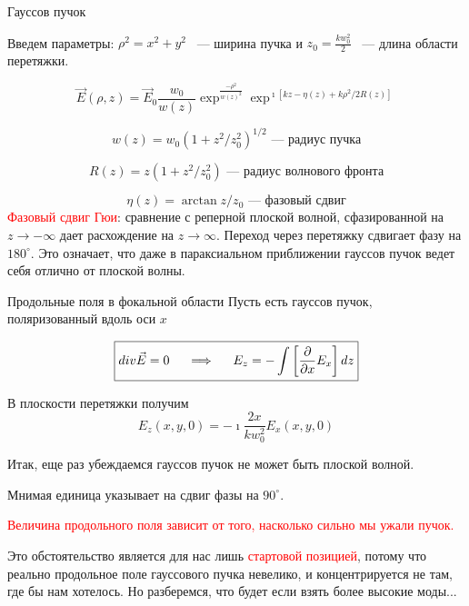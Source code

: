 \documentclass[9pt, compress, xcolor=table]{beamer}
\begin{document}
\begin{frame}{Гауссов пучок}

Введем параметры: $\rho^2 = x^2 + y^2$ ~--- ширина пучка и $z_0 = \frac{k w_0^2}{2}$ ~--- длина области перетяжки.

\begin{equation*}
\boxed{
\vec E(\rho,z) = \vec E_0 \frac{w_0}{w(z)}
\exp^{\frac{-\rho^2}{w(z)^2}}\exp^{\imath [kz - \eta(z) + k \rho^2/2R(z)]}}
\end{equation*}

\begin{equation*}
w(z) = w_0(1 + z^2/z_0^2)^{1/2}\text{~--- радиус пучка}
\end{equation*}

\begin{equation*}
R(z) = z(1 + z^2/z_0^2)\text{~--- радиус волнового фронта}
\end{equation*}

\begin{equation*}
\eta (z) = \arctan {z/z_0}\text{~--- фазовый сдвиг}
\end{equation*}
\textcolor{red}{Фазовый сдвиг Гюи}: сравнение с реперной плоской волной, сфазированной на $z \rightarrow -\infty$
дает расхождение на $z \rightarrow \infty$. Переход через перетяжку сдвигает фазу на $180^{\circ}$. Это означает, что даже в параксиальном приближении гауссов пучок ведет себя отлично от плоской волны.

\end{frame}


\begin{frame}{Продольные поля в фокальной области}
Пусть есть гауссов пучок, поляризованный вдоль оси $x$

\begin{equation*}
\boxed{
div\vec E = 0\hspace{0.5cm}\Longrightarrow\hspace{0.5 cm}E_z = - \int\left[\frac{\partial}{\partial x} E_x\right] dz}
\end{equation*} 

В плоскости перетяжки получим \begin{equation*} E_z(x,y,0) = -\imath \frac{2x}{kw_0^2} E_x(x,y,0)\end{equation*}

Итак, еще раз убеждаемся гауссов пучок не может быть плоской волной.

Мнимая единица указывает на сдвиг фазы на $90^{\circ}$. 

\textcolor{red}{Величина продольного поля зависит от того, насколько сильно мы ужали пучок.}

Это обстоятельство является для нас лишь \textcolor{red}{стартовой позицией}, потому что реально продольное поле гауссового пучка невелико, и концентрируется не там, где бы нам хотелось. Но разберемся, что будет если взять более высокие моды...

\end{frame}
\end{document}
